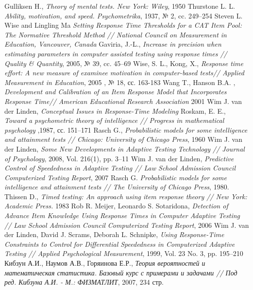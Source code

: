\begin{thebibliography}{2}
 Gulliksen H., {\itshape Theory of mental tests. New York: Wiley}, 1950
 Thurstone L. L. {\itshape Ability, motivation, and speed. Psychometrika}, 1937, № 2, cc. 249–254
 Steven L. Wise and Lingling Ma {\itshape Setting Response Time Thresholds for a CAT Item Pool: The Normative Threshold Method // National Council on Measurement in Education, Vancouver, Canada}
 Gaviria, J.-L., {\itshape Increase in precision when estimating parameters in computer assisted testing using response times // Quality \& Quantity}, 2005, № 39, cc. 45–69
 Wise, S. L., Kong, X., {\itshape Response time effort: A new measure of examinee motivation in computer-based tests// Applied Measurement in Education}, 2005 , № 18, сс. 163-183
 Wang T., Hanson B.A. , {\itshape Development and Calibration of an Item Response Model that Incorporates Response Time// American Educational Research Association} 2001
 Wim J. van der Linden, {\itshape   Conceptual Issues in Response-Time Modeling} 
 Roskam, E. E., {\itshape Toward a psychometric theory of intelligence // Progress in mathematical psychology },1987,  сс. 151–171
 Rasch G.,  {\itshape Probabilistic models for some intelligence and attainment tests // Chicago: University of Chicago Press}, 1960
 Wim J. van der Linden, {\itshape Some New Developments in Adaptive Testing Technology // Journal of Psychology}, 2008, Vol. 216(1), pp. 3–11
 Wim J. van der Linden, {\itshape   Predictive Control of Speededness in Adaptive Testing // Law School Admission Council Computerized Testing Report}, 2007
 Rasch G. {\itshape Probabilistic models for some intelligence and attainment tests // The University of Chicago Press}, 1980.
 Thissen D., {\itshape Timed testing: An approach using item response theory // New York: Academic Press.} 1983
 Rob R. Meijer, Leonardo S. Sotaridona, {\itshape Detection of Advance Item Knowledge Using Response Times in Computer Adaptive Testing // Law School Admission Council Computerized Testing Report}, 2006
 Wim J. van der Linden, David J. Scrams, Deborah L. Schnipke, {\itshape  Using Response-Time Constraints to Control for Differential Speededness in Computerized Adaptive Testing // Applied Psychological Measurement}, 1999, Vol. 23 No. 3, pp. 195–210
 Кибзун А.И., Наумов А.В., Горяинова Е.Р., {\itshape  Теория вероятностей и математическая статистика. Базовый курс с примерами и задачами // Под ред. Кибзуна А.И. - М.: ФИЗМАТЛИТ}, 2007, 234 стр.

\end{thebibliography}
